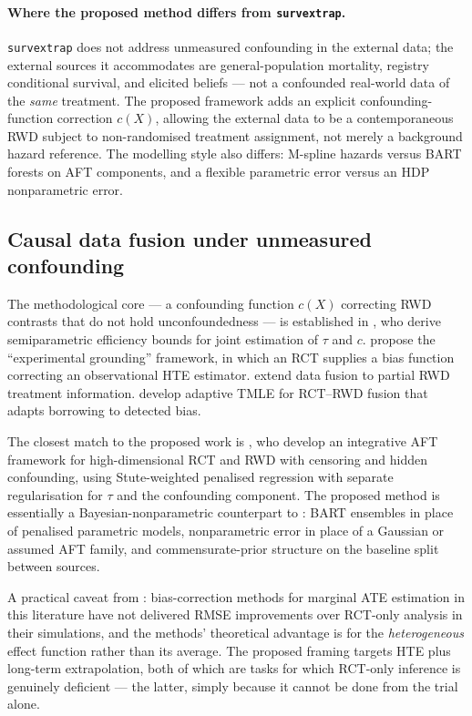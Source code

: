 \documentclass[11pt]{article}
\theoremstyle{plain}
\theoremstyle{definition}
\theoremstyle{remark}
\newcommand{\1}{\mathds{1}}
\newcommand{\X}{X}
\newcommand{\tauf}{\tau}
\newcommand{\cf}{c}
\begin{document}
\paragraph{Where the proposed method differs from \texttt{survextrap}.}
\texttt{survextrap} does not address unmeasured confounding in the external
data; the external sources it accommodates are general-population mortality,
registry conditional survival, and elicited beliefs --- not a confounded
real-world data of the \emph{same} treatment. The proposed framework
adds an explicit confounding-function correction $\cf(\X)$, allowing the
external data to be a contemporaneous RWD subject to non-randomised
treatment assignment, not merely a background hazard reference. The
modelling style also differs: M-spline hazards versus BART forests on
AFT components, and a flexible parametric error versus an HDP nonparametric
error.

\subsection{Causal data fusion under unmeasured confounding}

The methodological core --- a confounding function $\cf(\X)$ correcting RWD
contrasts that do not hold unconfoundedness --- is established in
\citet{YangLiuZengWang2025}, who derive semiparametric efficiency bounds for
joint estimation of $\tauf$ and $\cf$. \citet{Kallus2018} propose the
``experimental grounding'' framework, in which an RCT supplies a bias
function correcting an observational HTE estimator. \citet{Yao2024} extend
data fusion to partial RWD treatment information. \citet{vanderLaan2024}
develop adaptive TMLE for RCT--RWD fusion that adapts borrowing to detected
bias.

The closest match to the proposed work is \citet{Ye2025}, who develop an
integrative AFT framework for high-dimensional RCT and RWD with censoring
and hidden confounding, using Stute-weighted penalised regression with
separate regularisation for $\tauf$ and the confounding component. The
proposed method is essentially a Bayesian-nonparametric counterpart to
\citet{Ye2025}: BART ensembles in place of penalised parametric models,
nonparametric error in place of a Gaussian or assumed AFT family, and
commensurate-prior structure on the baseline split between sources.

A practical caveat from \citet{Lin2024}: bias-correction methods for
marginal ATE estimation in this literature have not delivered
RMSE improvements over RCT-only analysis in their simulations, and the
methods' theoretical advantage is for the \emph{heterogeneous} effect
function rather than its average. The proposed framing targets HTE
plus long-term extrapolation, both of which are tasks for which RCT-only
inference is genuinely deficient --- the latter, simply because it cannot
be done from the trial alone.
\end{document}
